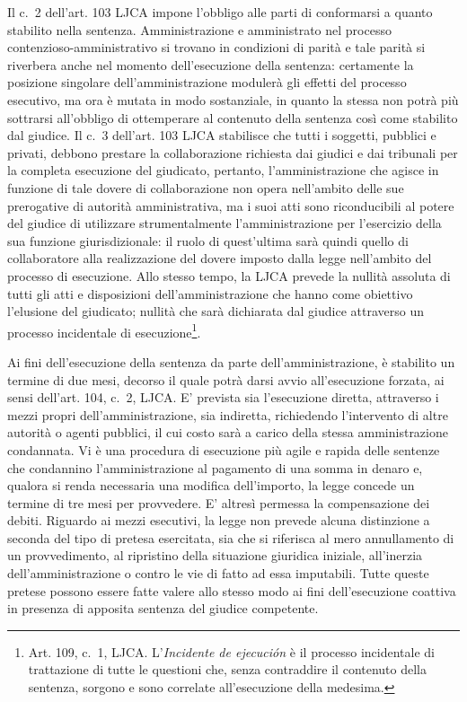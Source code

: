 \documentclass[12pt,it,a4paper,]{report}
\begin{document}
Il c.~2 dell'art. 103 LJCA impone l'obbligo alle parti di conformarsi a
quanto stabilito nella sentenza. Amministrazione e amministrato nel
processo contenzioso-amministrativo si trovano in condizioni di parità e
tale parità si riverbera anche nel momento dell'esecuzione della
sentenza: certamente la posizione singolare dell'amministrazione
modulerà gli effetti del processo esecutivo, ma ora è mutata in modo
sostanziale, in quanto la stessa non potrà più sottrarsi all'obbligo di
ottemperare al contenuto della sentenza così come stabilito dal giudice.
Il c.~3 dell'art. 103 LJCA stabilisce che tutti i soggetti, pubblici e
privati, debbono prestare la collaborazione richiesta dai giudici e dai
tribunali per la completa esecuzione del giudicato, pertanto,
l'amministrazione che agisce in funzione di tale dovere di
collaborazione non opera nell'ambito delle sue prerogative di autorità
amministrativa, ma i suoi atti sono riconducibili al potere del giudice
di utilizzare strumentalmente l'amministrazione per l'esercizio della
sua funzione giurisdizionale: il ruolo di quest'ultima sarà quindi
quello di collaboratore alla realizzazione del dovere imposto dalla
legge nell'ambito del processo di esecuzione. Allo stesso tempo, la LJCA
prevede la nullità assoluta di tutti gli atti e disposizioni
dell'amministrazione che hanno come obiettivo l'elusione del giudicato;
nullità che sarà dichiarata dal giudice attraverso un processo
incidentale di esecuzione\footnote{Art. 109, c.~1, LJCA.
  L'\emph{Incidente de ejecución} è il processo incidentale di
  trattazione di tutte le questioni che, senza contraddire il contenuto
  della sentenza, sorgono e sono correlate all'esecuzione della
  medesima.}.

Ai fini dell'esecuzione della sentenza da parte dell'amministrazione, è
stabilito un termine di due mesi, decorso il quale potrà darsi avvio
all'esecuzione forzata, ai sensi dell'art. 104, c.~2, LJCA. E' prevista
sia l'esecuzione diretta, attraverso i mezzi propri
dell'amministrazione, sia indiretta, richiedendo l'intervento di altre
autorità o agenti pubblici, il cui costo sarà a carico della stessa
amministrazione condannata. Vi è una procedura di esecuzione più agile e
rapida delle sentenze che condannino l'amministrazione al pagamento di
una somma in denaro e, qualora si renda necessaria una modifica
dell'importo, la legge concede un termine di tre mesi per provvedere. E'
altresì permessa la compensazione dei debiti. Riguardo ai mezzi
esecutivi, la legge non prevede alcuna distinzione a seconda del tipo di
pretesa esercitata, sia che si riferisca al mero annullamento di un
provvedimento, al ripristino della situazione giuridica iniziale,
all'inerzia dell'amministrazione o contro le vie di fatto ad essa
imputabili. Tutte queste pretese possono essere fatte valere allo stesso
modo ai fini dell'esecuzione coattiva in presenza di apposita sentenza
del giudice competente.
\end{document}
